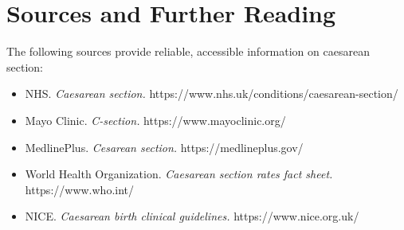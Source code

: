 \section*{Sources and Further Reading}
The following sources provide reliable, accessible information on caesarean section:
\begin{itemize}
    \item NHS. \textit{Caesarean section.} https://www.nhs.uk/conditions/caesarean-section/
    \item Mayo Clinic. \textit{C-section.} https://www.mayoclinic.org/
    \item MedlinePlus. \textit{Cesarean section.} https://medlineplus.gov/
    \item World Health Organization. \textit{Caesarean section rates fact sheet.} https://www.who.int/
    \item NICE. \textit{Caesarean birth clinical guidelines.} https://www.nice.org.uk/
\end{itemize}

